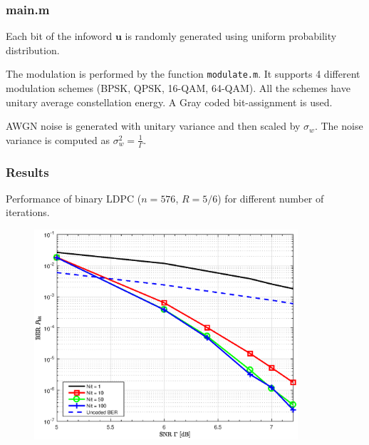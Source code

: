 \documentclass[]{beamer}
\begin{document}
\begin{frame}
\transwipe[direction=0]
\frametitle{main.m}
Each bit of the infoword $\mathbf{u}$ is randomly generated using uniform probability distribution.

\vspace{0.5cm}

The modulation is performed by the function \texttt{modulate.m}. It supports 4 different modulation schemes (BPSK, QPSK, 16-QAM, 64-QAM). All the schemes have unitary average constellation energy.
A Gray coded bit-assignment is used.%

\vspace{0.5cm}

AWGN noise is generated with unitary variance and then scaled by $\sigma_w$. The noise variance is computed as $\sigma_w^2 = \frac{1}{\Gamma}$. %
\end{frame}

\begin{frame}
\transwipe[direction=0]
\frametitle{Results}
Performance of binary LDPC ($n = 576$, $R = 5/6$) for different number of iterations.
\begin{center}
\begin{figure}
\includegraphics[width=9.8cm, trim={0 0 0 0.9cm},clip]{figure1/Nit}
\end{figure}
\end{center}

\end{frame}
\end{document}
